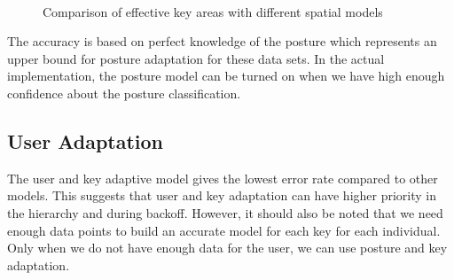 \documentclass{sigchi}
\begin{document}
\begin{figure}[tb]
	\centering
	 ~
	\caption{Comparison of effective key areas with different spatial models}
	\label{fig:key-boundary}
\end{figure}

The accuracy is based on perfect knowledge of the posture which represents an
upper bound for posture adaptation for these data sets. In the actual 
implementation, the posture model can be turned on when we have high enough 
confidence about the posture classification.

\subsection{User Adaptation}
The user and key adaptive model gives the lowest error rate compared to other models. 
This suggests that user and key adaptation can have higher priority in the hierarchy and during
backoff. However, it should also be noted that we need enough data points to build an
accurate model for each key for each individual.
Only when we do not have enough data for the user, we can use posture and key adaptation.
\end{document}
